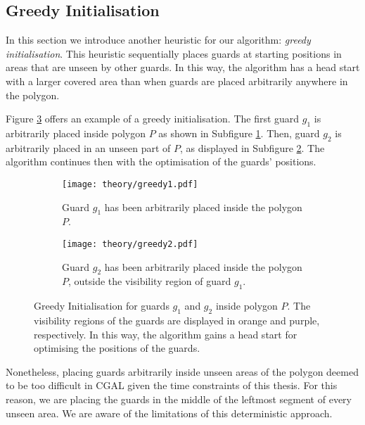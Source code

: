 \newpage
\subsection{Greedy Initialisation}
\label{sec:greedy}
In this section we  introduce another heuristic for our algorithm: \textit{greedy initialisation}. This heuristic sequentially places guards at starting positions in areas that are unseen by other guards. In this way, the algorithm has a head start with a larger covered area than when guards are placed arbitrarily anywhere in the polygon.

Figure \ref{fig:greedy} offers an example of a greedy initialisation. The first guard $g_1$ is arbitrarily placed inside polygon $P$ as shown in Subfigure \ref{fig:greedy1}. Then, guard $g_2$ is arbitrarily placed in an unseen part of $P$, as displayed in Subfigure \ref{fig:greedy2}. The algorithm continues then with the optimisation of the guards' positions.

\begin{figure}[h!]
    \centering
    \begin{subfigure}{0.45\textwidth}
        \texttt{[image: theory/greedy1.pdf]}
        \caption{Guard $g_1$ has been arbitrarily placed inside the polygon $P$.}
        \label{fig:greedy1}
    \end{subfigure}
    \hfill
    \begin{subfigure}{0.45\textwidth}
        \texttt{[image: theory/greedy2.pdf]}
        \caption{Guard $g_2$ has been arbitrarily placed inside the polygon $P$, outside the visibility region of guard $g_1$.}
        \label{fig:greedy2}
    \end{subfigure}
    \caption{Greedy Initialisation for guards $g_1$ and $g_2$ inside polygon $P$. The visibility regions of the guards are displayed in orange and purple, respectively. In this way, the algorithm gains a head start for optimising the positions of the guards.}
    \label{fig:greedy}
\end{figure}

Nonetheless, placing guards arbitrarily inside unseen areas of the polygon deemed to be too difficult in CGAL given the time constraints of this thesis. For this reason, we are placing the guards in the middle of the leftmost segment of every unseen area. We are aware of the limitations of this deterministic approach.